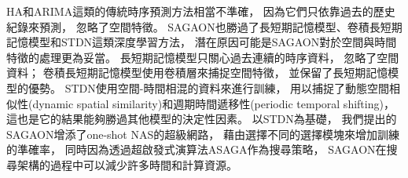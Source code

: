 \documentclass[a4paper,14pt]{extarticle}
\begin{document}
                HA和ARIMA這類的傳統時序預測方法相當不準確，
                因為它們只依靠過去的歷史紀錄來預測，
                忽略了空間特徵。
                SAGAON也勝過了長短期記憶模型、卷積長短期記憶模型和STDN這類深度學習方法，
                潛在原因可能是SAGAON對於空間與時間特徵的處理更為妥當。
                長短期記憶模型只關心過去連續的時序資料，
                忽略了空間資料；
                卷積長短期記憶模型使用卷積層來捕捉空間特徵，
                並保留了長短期記憶模型的優勢。
                STDN使用空間-時間相混的資料來進行訓練，
                用以捕捉了動態空間相似性(dynamic spatial similarity)和週期時間遞移性(periodic temporal shifting)，
                這也是它的結果能夠勝過其他模型的決定性因素。
                以STDN為基礎，
                我們提出的SAGAON增添了one-shot NAS的超級網路，
                藉由選擇不同的選擇模塊來增加訓練的準確率，
                同時因為透過超啟發式演算法ASAGA作為搜尋策略，
                SAGAON在搜尋架構的過程中可以減少許多時間和計算資源。
\end{document}
